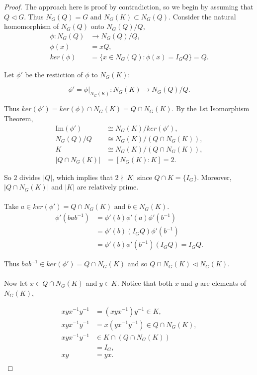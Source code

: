 \documentclass[a4paper , 11pt]{book}
\theoremstyle{definition}
\theoremstyle{remark}
\begin{document}
\begin{proof} The approach here is proof by contradiction, so we begin by assuming that $Q \vartriangleleft G$. Thus $N_G(Q) = G$ and $N_G(K) \subset N_G(Q)$. Consider the natural homomorphism of $N_G(Q)$ onto $N_G(Q)/Q$,
\begin{align*} \phi : N_G(Q) &\longrightarrow N_G(Q)/Q, \\
\phi(x) &= xQ, \\
ker(\phi) &= \{ x \in N_G(Q) : \phi(x) = I_G Q \} = Q.
\end{align*}

Let $\phi '$ be the restiction of $\phi$ to $N_G(K)$: 

\begin{equation*} \phi ' = \left.\phi\right|_{N_G(K)} : N_G(K) \longrightarrow N_G(Q)/Q.
\end{equation*}

Thus $ker(\phi ') = ker(\phi) \cap N_G(K) = Q \cap N_G(K)$. By the 1st Isomorphism Theorem,
\begin{align*} \text{Im}(\phi ') &\cong N_G(K) / ker(\phi '), \\
N_G(Q)/Q &\cong N_G(K) / (Q \cap N_G(K)), \\
K &\cong N_G(K) / (Q \cap N_G(K)) \tag{$N_G(Q) = QK$}, \\
|Q \cap N_G(K)| &= [N_G(K) : K] = 2. \tag{by assumption}
\end{align*}

So $2$ divides $|Q|$, which implies that $2 \nmid |K|$ since $Q \cap K = \{ I_G \}$. Moreover, $|Q \cap N_G(K)|$ and $|K|$ are relatively prime. \\
\\
Take $a \in ker(\phi') = Q \cap N_G(K)$ and $b \in N_G(K)$.
\begin{align*} \phi'(bab^{-1}) &= \phi'(b)\phi'(a)\phi'(b^{-1}) \\
&= \phi'(b)(I_G Q) \phi'(b^{-1}) \\
&=  \phi'(b)\phi'(b^{-1})(I_G Q) =  I_G Q. \end{align*}

Thus $bab^{-1} \in ker(\phi') = Q \cap N_G(K)$ and so $Q \cap N_G(K) \vartriangleleft N_G(K)$. \\
\\
Now let $x \in Q \cap N_G(K)$ and $y \in K$. Notice that both $x$ and $y$ are elements of $N_G(K)$,

\begin{align*} xyx^{-1}y^{-1} &=  (xyx^{-1})y^{-1} \in K, \tag{since $K \vartriangleleft N_G(K)$} \\
xyx^{-1}y^{-1} &= x(yx^{-1}y^{-1}) \in Q \cap N_G(K), \tag{since $Q \cap N_G(K) \vartriangleleft N_G(K)$} \\
xyx^{-1}y^{-1} &\in K \cap ( Q \cap N_G(K)) \\
&= I_G, \tag{since gcd$(|Q \cap N_G(K)|,|K|) = 1$} \\
xy &= yx. \\
\end{align*}


\end{proof}
\end{document}
